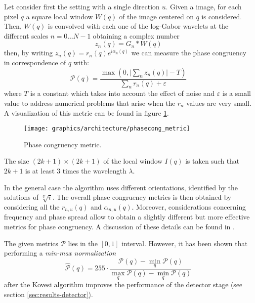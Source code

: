 		\par{
			Let consider first the setting with a single direction $u$. Given a image, for each pixel $q$ a square local window $W(q)$ of the image centered on $q$ is considered. Then, $W(q)$ is convolved with each one of the log-Gabor wavelets at the different scales $n = 0 \dots N-1$ obtaining a complex number
	    	\begin{equation*}
	    		z_{n} (q) = G_{n} * W(q)
	    	\end{equation*}
	    	then, by writing $z_{n} (q) = r_{n} (q) e^{i \alpha_{n} (q)}$ we can measure the phase congruency in correspondence of $q$ with:
            \begin{equation*}
	            \mathcal{P} (q) = \frac{\max(0,\lvert \sum_{n} z_{n} (q) \rvert - T)}{\sum_{n} r_{n} (q) + \varepsilon}
            \end{equation*}
            where $T$ is a constant which takes into account the effect of noise and $\varepsilon$ is a small value to address numerical problems that arise when the $r_n$ values are very small. A visualization of this metric can be found in figure \ref{fig:phase-congruency-metric}.
        }
	    \begin{figure}
	    	\centering
	    	\texttt{[image: graphics/architecture/phasecong\_metric]}
	    	\caption{Phase congruency metric.}
	    	\label{fig:phase-congruency-metric}
	    \end{figure}
	    \par{
	    	The size $(2k+1)\times(2k+1)$ of the local window $I(q)$ is taken such that $2k+1$ is at least $3$ times the wavelength $\lambda$.
		}
        \par{
        	In the general case the algorithm uses different orientations, identified by the solutions of $\sqrt[U]{i}$. The overall phase congruency metrics is then obtained by considering all the $r_{n,u}(q)$ and $\alpha_{n,u}(q)$. Moreover, considerations concerning frequency and phase spread allow to obtain a slightly different but more effective metrics for phase congruency. A discussion of these details can be found in \cite{mit:kovesiphase}.
        }
        \par{
        	The given metrics $\mathcal{P}$ lies in the $[0,1]$ interval. However, it has been shown that performing a \emph{min-max normalization}
        	\begin{equation*}
        	\hat{\mathcal{P}}(q) = 255 \cdot \frac{\mathcal{P}(q)-\min_q\mathcal{P}(q)}{\max_q\mathcal{P}(q)-\min_q\mathcal{P}(q)}
        	\end{equation*}
        	 after the Kovesi algorithm improves the performance of the detector stage (see section \ref{sec:results-detector}).
        }
